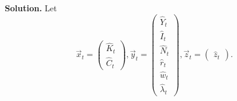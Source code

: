 \documentclass[11pt]{article}
\numberwithin{equation}{section} %
\numberwithin{figure}{section} %
\numberwithin{table}{section} %
\theoremstyle{definition}
\newenvironment{solution}{\begin{addmargin}[2em]{0em} {\bf Solution. }}{\end{addmargin}}
\begin{document}
\begin{solution}
    Let
    \[
        \vec{x}_t = \begin{pmatrix}
            \hat{K}_t \\
            \hat{C}_t
        \end{pmatrix}, \vec{y}_t = \begin{pmatrix}
            \hat{Y}_t \\
            \hat{I}_t \\
            \hat{N}_t \\
            \hat{r}_t \\
            \hat{w}_t \\
            \hat{\lambda}_t
        \end{pmatrix}, \vec{z}_t = \begin{pmatrix}
            \hat{z}_t
        \end{pmatrix}.
    \]


\end{solution}
\end{document}
